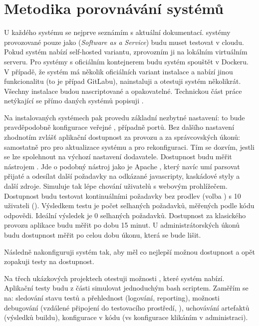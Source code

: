 \section{Metodika porovnávání \CI systémů}
    U každého systému se nejprve seznámím s aktuální dokumentací. \CI systémy provozované pouze jako  (\textit{Software as a Service}) budu muset testovat v cloudu. Pokud systém nabízí self-hosted variantu, zprovozním ji na lokálním virtuálním serveru. Pro systémy s oficiálním kontejnerem budu systém spouštět v Dockeru. V případě, že systém má několik oficiálních variant instalace a nabízí jinou funkcionalitu (to je případ GitLabu), nainstaluji a otestuji systém několikrát. Všechny instalace budou nascriptované a opakovatelné. Technickou část práce netýkající se přímo daných \CI systémů popisuji .

    Na instalovaných systémech pak provedu základní nezbytné nastavení: to bude pravděpodobně konfigurace veřejné , případně portů.  Bez dalšího nastavení zhodnotím zvlášť aplikační dostupnost za provozu a za správcovských úkonů: samostatně pro pro aktualizace \CI systému a pro rekonfiguraci. Tím se dozvím, jestli se lze spolehnout na výchozí nastavení dodavatele. Dostupnost budu měřit nástrojem  \cite{fulmer-siege}. Jde o podobný nástroj jako je Apache  \cite{apache-ab}, který navíc umí parsovat přijaté  a odesílat další požadavky na odkázané javascripty, kaskádové styly a další zdroje. Simuluje tak lépe chování uživatelů s webovým prohlížečem. Dostupnost budu testovat kontinuálními požadavky bez prodlev (volba ) s 10 uživateli (). Výsledkem testu je počet selhaných požadavků, měřených podle \HTTP kódu odpovědi. Ideální výsledek je 0 selhaných požadavků. Dostupnost za klasického provozu aplikace budu měřit po dobu 15 minut. U administrátorských úkonů budu dostupnost měřit po celou dobu úkonu, která se bude lišit.

    Následně nakonfiguruji systém tak, aby měl co nejlepší možnou dostupnost a opět zopakuji testy na dostupnost.

    Na třech ukázkových projektech otestuji možnosti \CI, které systém nabízí. Aplikační testy budu z části simulovat jednoduchým bash scriptem.  Zaměřím se na: sledování stavu testů a přehlednost (logování, reporting), možnosti debugování (vzdálené připojení do testovacího prostředí, ), uchovávání artefaktů (výsledků buildu), konfigurace v kódu (vs konfigurace klikáním v administraci). 

